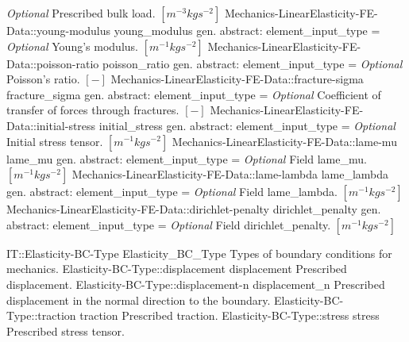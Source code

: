 \begin{RecordType}
			{ \it{Optional}}
			{{{Prescribed bulk load. }{$[m^{-3}kgs^{-2}]$}%
}}
		\RecKey
			{Mechanics-LinearElasticity-FE-Data::young-modulus}
			{young{\_}modulus}
			{{gen. abstract: }}{{element{\_}input{\_}type}{ = }}
			{ \it{Optional}}
			{{{Young's modulus. }{$[m^{-1}kgs^{-2}]$}%
}}
		\RecKey
			{Mechanics-LinearElasticity-FE-Data::poisson-ratio}
			{poisson{\_}ratio}
			{{gen. abstract: }}{{element{\_}input{\_}type}{ = }}
			{ \it{Optional}}
			{{{Poisson's ratio. }{$[-]$}%
}}
		\RecKey
			{Mechanics-LinearElasticity-FE-Data::fracture-sigma}
			{fracture{\_}sigma}
			{{gen. abstract: }}{{element{\_}input{\_}type}{ = }}
			{ \it{Optional}}
			{{{Coefficient of transfer of forces through fractures. }{$[-]$}%
}}
		\RecKey
			{Mechanics-LinearElasticity-FE-Data::initial-stress}
			{initial{\_}stress}
			{{gen. abstract: }}{{element{\_}input{\_}type}{ = }}
			{ \it{Optional}}
			{{{Initial stress tensor. }{$[m^{-1}kgs^{-2}]$}%
}}
		\RecKey
			{Mechanics-LinearElasticity-FE-Data::lame-mu}
			{lame{\_}mu}
			{{gen. abstract: }}{{element{\_}input{\_}type}{ = }}
			{ \it{Optional}}
			{{{Field lame{\_}mu. }{$[m^{-1}kgs^{-2}]$}%
}}
		\RecKey
			{Mechanics-LinearElasticity-FE-Data::lame-lambda}
			{lame{\_}lambda}
			{{gen. abstract: }}{{element{\_}input{\_}type}{ = }}
			{ \it{Optional}}
			{{{Field lame{\_}lambda. }{$[m^{-1}kgs^{-2}]$}%
}}
		\RecKey
			{Mechanics-LinearElasticity-FE-Data::dirichlet-penalty}
			{dirichlet{\_}penalty}
			{{gen. abstract: }}{{element{\_}input{\_}type}{ = }}
			{ \it{Optional}}
			{{{Field dirichlet{\_}penalty. }{$[m^{-1}kgs^{-2}]$}%
}}
\end{RecordType}
\begin{SelectionType}
	{IT::Elasticity-BC-Type}
	{Elasticity{\_}BC{\_}Type}
	{{{Types of boundary conditions for mechanics.}%
}}
		\SelectionItem
			{Elasticity-BC-Type::displacement}
			{displacement}
			{{{Prescribed displacement.}%
}}
		\SelectionItem
			{Elasticity-BC-Type::displacement-n}
			{displacement{\_}n}
			{{{Prescribed displacement in the normal direction to the boundary.}%
}}
		\SelectionItem
			{Elasticity-BC-Type::traction}
			{traction}
			{{{Prescribed traction.}%
}}
		\SelectionItem
			{Elasticity-BC-Type::stress}
			{stress}
			{{{Prescribed stress tensor.}%
}}
\end{SelectionType}
